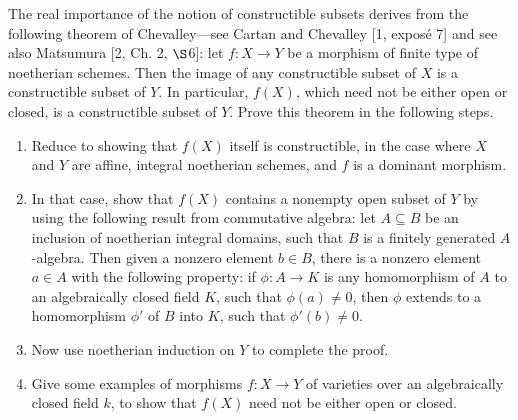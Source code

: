 \begin{exercise}%
	The real importance of the notion of constructible subsets derives from the following theorem of Chevalley---see Cartan and Chevalley [1, expos\'e 7] and see also Matsumura [2, Ch. 2, $\S $6]: let $f:X \to Y$ be a morphism of finite type of noetherian schemes. Then the image of any constructible subset of $X$ is a constructible subset of $Y$. In particular, $f(X)$, which need not be either open or closed, is a constructible subset of $Y$. Prove this theorem in the following steps.
	\begin{enumerate}
		\item Reduce to showing that $f(X)$ itself is constructible, in the case where $X$ and $Y$ are affine, integral noetherian schemes, and $f$ is a dominant morphism.
		\item In that case, show that $f(X)$ contains a nonempty open subset of $Y$ by using the following result from commutative algebra: let $A \subseteq B$ be an inclusion of noetherian integral domains, such that $B$ is a finitely generated $A$-algebra. Then given a nonzero element $b \in B$, there is a nonzero element $a \in A$ with the following property: if $\phi: A \to K$ is any homomorphism of $A$ to an algebraically closed field $K$, such that $\phi(a) \ne 0$, then $\phi$ extends to a homomorphism $\phi'$ of $B$ into $K$, such that $\phi'(b) \ne 0$.
			\ifhint
				[Hint: Prove this algebraic result by induction on the number of generators of $B$ over $A$. For the case of one generator, prove the result directly. In the application, take $b = 1$.]
			\fi
		\item Now use noetherian induction on $Y$ to complete the proof.
		\item Give some examples of morphisms $f: X \to Y$ of varieties over an algebraically closed field $k$, to show that $f(X)$ need not be either open or closed.
	\end{enumerate}
\end{exercise}

